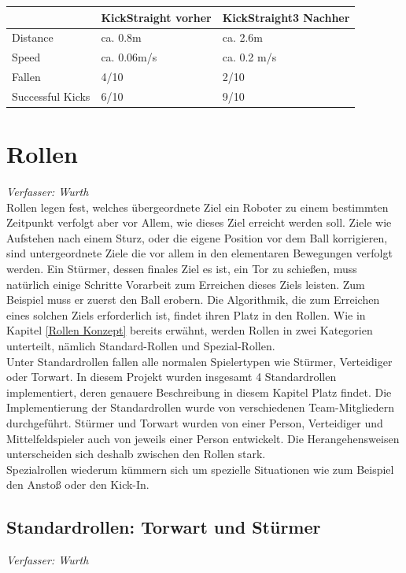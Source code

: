 \documentclass[fontsize=12pt,a4paper,final]{scrartcl}[2003/01/01]
\begin{document}
\begin{tabularx}{\textwidth}{|X|X|X|}
\hline
 & \textbf{KickStraight vorher} & \textbf{KickStraight3 Nachher}\\
\hline
\hline
 Distance & ca. 0.8m & ca. 2.6m\\
\hline 
 Speed & ca. 0.06m/s & ca. 0.2 m/s\\
\hline
 Fallen & 4/10 & 2/10\\
\hline
 Successful Kicks & 6/10 & 9/10\\
\hline
\end{tabularx}

\section{Rollen}
\textit{Verfasser: Wurth}\\

Rollen legen fest, welches übergeordnete Ziel ein Roboter zu einem bestimmten Zeitpunkt verfolgt aber vor Allem, wie dieses Ziel erreicht werden soll. Ziele wie Aufstehen nach einem Sturz, oder die eigene Position vor dem Ball korrigieren, sind untergeordnete Ziele die vor allem in den elementaren Bewegungen verfolgt werden. Ein Stürmer, dessen finales Ziel es ist, ein Tor zu schießen, muss natürlich einige Schritte Vorarbeit zum Erreichen dieses Ziels leisten. Zum Beispiel muss er zuerst den Ball erobern. Die Algorithmik, die zum Erreichen eines solchen Ziels erforderlich ist, findet ihren Platz in den Rollen. Wie in Kapitel \ref{Rollen Konzept} bereits erwähnt, werden Rollen in zwei Kategorien unterteilt, nämlich Standard-Rollen und Spezial-Rollen.
\\

Unter Standardrollen fallen alle normalen Spielertypen wie Stürmer, Verteidiger oder Torwart. In diesem Projekt wurden insgesamt 4 Standardrollen implementiert, deren genauere Beschreibung in diesem Kapitel Platz findet. Die Implementierung der Standardrollen wurde von verschiedenen Team-Mitgliedern durchgeführt. Stürmer und Torwart wurden von einer Person, Verteidiger und Mittelfeldspieler auch von jeweils einer Person entwickelt. Die Herangehensweisen unterscheiden sich deshalb zwischen den Rollen stark.
\\

Spezialrollen wiederum kümmern sich um spezielle Situationen wie zum Beispiel den Anstoß oder den Kick-In.


\subsection{Standardrollen: Torwart und Stürmer}
\textit{Verfasser: Wurth}\\
\end{document}
